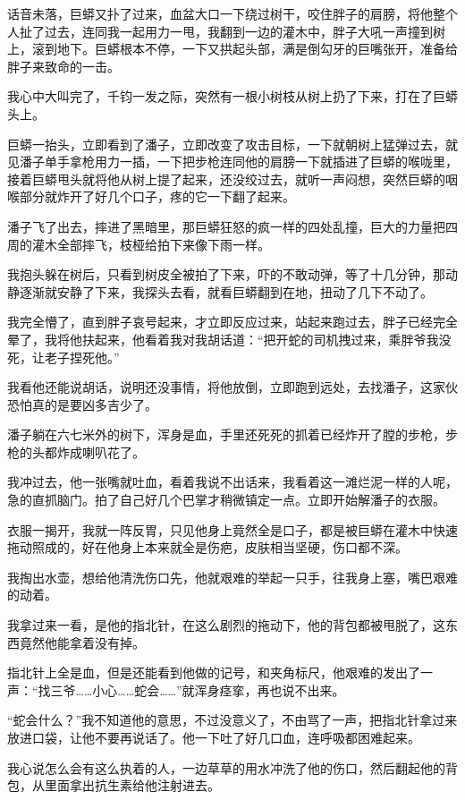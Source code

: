 话音未落，巨蟒又扑了过来，血盆大口一下绕过树干，咬住胖子的肩膀，将他整个人扯了过去，连同我一起用力一甩，我翻到一边的灌木中，胖子大吼一声撞到树上，滚到地下。巨蟒根本不停，一下又拱起头部，满是倒勾牙的巨嘴张开，准备给胖子来致命的一击。

我心中大叫完了，千钧一发之际，突然有一根小树枝从树上扔了下来，打在了巨蟒头上。

巨蟒一抬头，立即看到了潘子，立即改变了攻击目标，一下就朝树上猛弹过去，就见潘子单手拿枪用力一插，一下把步枪连同他的肩膀一下就插进了巨蟒的喉咙里，接着巨蟒甩头就将他从树上提了起来，还没绞过去，就听一声闷想，突然巨蟒的咽喉部分就炸开了好几个口子，疼的它一下翻了起来。

潘子飞了出去，摔进了黑暗里，那巨蟒狂怒的疯一样的四处乱撞，巨大的力量把四周的灌木全部摔飞，枝桠给拍下来像下雨一样。

我抱头躲在树后，只看到树皮全被拍了下来，吓的不敢动弹，等了十几分钟，那动静逐渐就安静了下来，我探头去看，就看巨蟒翻到在地，扭动了几下不动了。

我完全懵了，直到胖子哀号起来，才立即反应过来，站起来跑过去，胖子已经完全晕了，我将他扶起来，他看着我对我胡话道：“把开蛇的司机拽过来，乘胖爷我没死，让老子捏死他。”

我看他还能说胡话，说明还没事情，将他放倒，立即跑到远处，去找潘子，这家伙恐怕真的是要凶多吉少了。

潘子躺在六七米外的树下，浑身是血，手里还死死的抓着已经炸开了膛的步枪，步枪的头都炸成喇叭花了。

我冲过去，他一张嘴就吐血，看着我说不出话来，我看着这一滩烂泥一样的人呢，急的直抓脑门。拍了自己好几个巴掌才稍微镇定一点。立即开始解潘子的衣服。

衣服一揭开，我就一阵反胃，只见他身上竟然全是口子，都是被巨蟒在灌木中快速拖动照成的，好在他身上本来就全是伤疤，皮肤相当坚硬，伤口都不深。

我掏出水壶，想给他清洗伤口先，他就艰难的举起一只手，往我身上塞，嘴巴艰难的动着。

我拿过来一看，是他的指北针，在这么剧烈的拖动下，他的背包都被甩脱了，这东西竟然他能拿着没有掉。

指北针上全是血，但是还能看到他做的记号，和夹角标尺，他艰难的发出了一声：“找三爷……小心……蛇会……”就浑身痉挛，再也说不出来。

“蛇会什么？”我不知道他的意思，不过没意义了，不由骂了一声，把指北针拿过来放进口袋，让他不要再说话了。他一下吐了好几口血，连呼吸都困难起来。

我心说怎么会有这么执着的人，一边草草的用水冲洗了他的伤口，然后翻起他的背包，从里面拿出抗生素给他注射进去。

